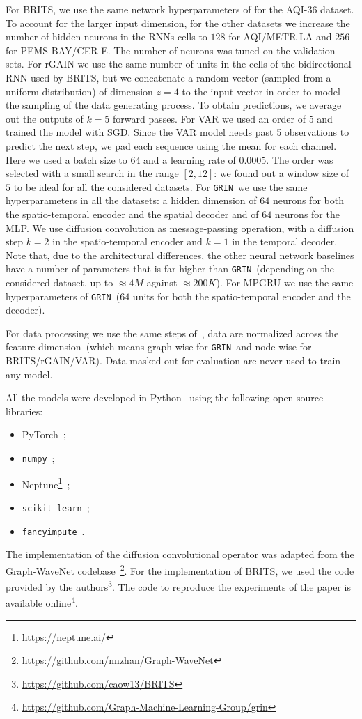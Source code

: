 \documentclass{article} \usepackage{iclr2022_conference,times}
\newcommand{\GRIL}{\texttt{GRIN}}
\begin{document}
For BRITS, we use the same network hyperparameters of \citet{cao2018brits} for the AQI-36 dataset. To account for the larger input dimension, for the other datasets we increase the number of hidden neurons in the RNNs cells to $128$ for AQI/METR-LA and $256$ for PEMS-BAY/CER-E. The number of neurons was tuned on the validation sets.
For rGAIN we use the same number of units in the cells of the bidirectional RNN used by BRITS, but we concatenate a random vector (sampled from a uniform distribution) of dimension $z=4$ to the input vector in order to model the sampling of the data generating process. To obtain predictions, we average out the outputs of $k=5$ forward passes.
For VAR we used an order of $5$ and trained the model with SGD. Since the VAR model needs past 5 observations to predict the next step, we pad each sequence using the mean for each channel.  Here we used a batch size to $64$ and a learning rate of $0.0005$. The order was selected with a small search in the range $[2, 12]$: we found out a window size of $5$ to be ideal for all the considered datasets.
For \GRIL\ we use the same hyperparameters in all the datasets: a hidden dimension of $64$ neurons for both the spatio-temporal encoder and the spatial decoder and of $64$ neurons for the MLP. We use diffusion convolution as message-passing operation, with a diffusion step $k=2$ in the spatio-temporal encoder and $k=1$ in the temporal decoder. Note that, due to the architectural differences, the other neural network baselines have a number of parameters that is far higher than \GRIL\ (depending on the considered dataset, up to $\approx4M$ against $\approx200K$). 
For MPGRU we use the same hyperparameters of \GRIL~($64$ units for both the spatio-temporal encoder and the decoder).

For data processing we use the same steps of~\citet{li2018diffusion}, data are normalized across the feature dimension~(which means graph-wise for \GRIL\  and node-wise for BRITS/rGAIN/VAR). Data masked out for evaluation are never used to train any model.

All the models were developed in Python~\citep{rossum2009python} using the following open-source libraries:
\begin{itemize}
    \item PyTorch~\citep{paszke2019pytorch};
    \item \texttt{numpy}~\citep{harris2020array};
\item Neptune\footnote{\url{https://neptune.ai/}}~\citep{neptune2021neptune};
    \item \texttt{scikit-learn}~\citep{pedregosa2011scikit};
    \item \texttt{fancyimpute}~\citep{fancyimpute}.
\end{itemize}
The implementation of the diffusion convolutional operator was adapted from the Graph-WaveNet codebase~\footnote{\url{https://github.com/nnzhan/Graph-WaveNet}}. For the implementation of BRITS, we used the code provided by the authors\footnote{\url{https://github.com/caow13/BRITS}}. The code to reproduce the experiments of the paper is available online\footnote{\url{https://github.com/Graph-Machine-Learning-Group/grin}}.
\end{document}
